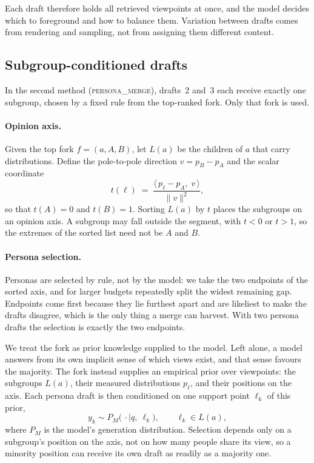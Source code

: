 \documentclass[11pt]{article}
\begin{document}
Each draft therefore holds all retrieved viewpoints at once, and the model
decides which to foreground and how to balance them. Variation between drafts
comes from rendering and sampling, not from assigning them different content.

\subsection{Subgroup-conditioned drafts}

In the second method (\textsc{persona\_merge}), drafts~2 and~3 each receive
exactly one subgroup, chosen by a fixed rule from the top-ranked fork. Only
that fork is used.

\paragraph{Opinion axis.} Given the top fork $f = (a, A, B)$, let $L(a)$ be the
children of $a$ that carry distributions. Define the pole-to-pole direction
$v = p_B - p_A$ and the scalar coordinate
\begin{equation}
  t(\ell) \;=\; \frac{\langle\, p_\ell - p_A,\; v \,\rangle}
                     {\lVert v \rVert^{2}},
\end{equation}
so that $t(A) = 0$ and $t(B) = 1$. Sorting $L(a)$ by $t$ places the subgroups on
an opinion axis. A subgroup may fall outside the segment, with $t < 0$ or
$t > 1$, so the extremes of the sorted list need not be $A$ and $B$.

\paragraph{Persona selection.} Personas are selected by rule, not by the model:
we take the two endpoints of the sorted axis, and for larger budgets repeatedly
split the widest remaining gap. Endpoints come first because they lie furthest
apart and are likeliest to make the drafts disagree, which is the only thing a
merge can harvest. With two persona drafts the selection is exactly the two
endpoints.

We treat the fork as prior knowledge supplied to the model. Left alone, a model
answers from its own implicit sense of which views exist, and that sense favours
the majority. The fork instead supplies an empirical prior over viewpoints: the
subgroups $L(a)$, their measured distributions $p_\ell$, and their positions on
the axis. Each persona draft is then conditioned on one support point
$\ell_k$ of this prior,
\begin{equation}
  y_k \sim P_M\bigl(\,\cdot \mid q,\ \ell_k\bigr),
  \qquad \ell_k \in L(a),
\end{equation}
where $P_M$ is the model's generation distribution. Selection depends only on a
subgroup's position on the axis, not on how many people share its view, so a
minority position can receive its own draft as readily as a majority one.
\end{document}
